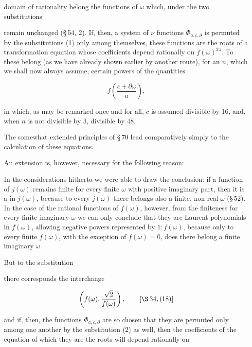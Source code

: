 domain of rationality belong the functions of $\omega$ which, under
the two substitutions


remain unchanged (\S\,54, 2). If, then, a system of $\nu$
functions $\Phi_{a,c,\partial}$ is permuted by the substitutions (1) only among
themselves, these functions are the roots of a
transformation equation whose coefficients depend rationally on
$f(\omega)^{24}$. To these belong (as we have already shown earlier by another
route), for an  $n$, which we shall
now always assume, certain powers of the quantities

\[
f\left(\frac{c+\partial\omega}{a}\right),
\]

in which, as may be remarked once and for all, $c$ is assumed divisible by 16, and,
when $n$ is not divisible by 3, divisible by 48.

The somewhat extended principles of \S\,70 lead comparatively
simply to the calculation of these equations.

An extension is, however, necessary for the following reason:

In the considerations hitherto we were able to draw the
conclusion: if a  function of $j(\omega)$ remains finite for every
finite $\omega$ with positive imaginary part, then it is
a  in $j(\omega)$, because to every  $j(\omega)$
there belongs also a finite, non-real $\omega$ (\S\,52). In the case of the
rational functions of $f(\omega)$, however, from the finiteness
for every finite imaginary $\omega$ we can only conclude that they are Laurent
polynomials in $f(\omega)$, allowing negative powers represented by $1:f(\omega)$,
because only to every finite
$f(\omega)$, with the exception of $f(\omega) = 0$, does there belong a finite
imaginary $\omega$.

But to the substitution


there corresponds the interchange

\[
\left(f(\omega), \frac{\sqrt{2}}{f(\omega)}\right), \qquad [\S\,34, (18)]
\]

and if, then, the functions $\Phi_{a,c,\partial}$ are so chosen that they
are permuted only among one another by the substitution (2) as well,
then the coefficients of the equation of which they are the roots will
depend rationally on
